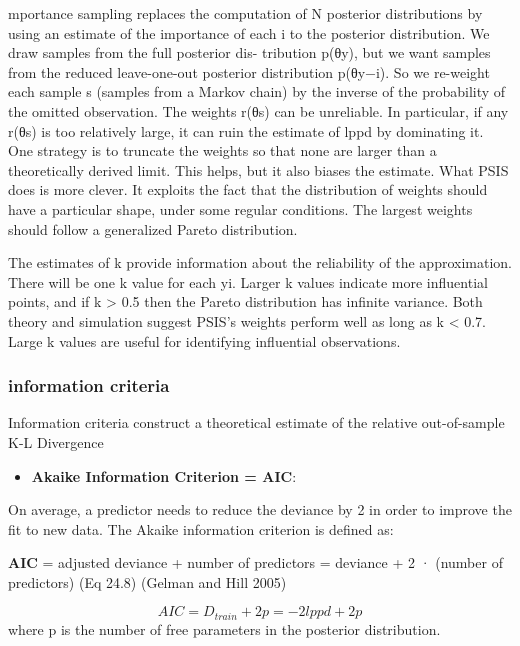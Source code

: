 \documentclass[
]{article}
\providecommand{\tightlist}{%
  \setlength{\itemsep}{0pt}\setlength{\parskip}{0pt}}
\begin{document}
mportance sampling replaces the computation of N posterior distributions
by using an estimate of the importance of each i to the posterior
distribution. We draw samples from the full posterior dis- tribution
p(θ\textbar y), but we want samples from the reduced leave-one-out
posterior distribution p(θ\textbar y−i). So we re-weight each sample s
(samples from a Markov chain) by the inverse of the probability of the
omitted observation. The weights r(θs) can be unreliable. In particular,
if any r(θs) is too relatively large, it can ruin the estimate of lppd
by dominating it. One strategy is to truncate the weights so that none
are larger than a theoretically derived limit. This helps, but it also
biases the estimate. What PSIS does is more clever. It exploits the fact
that the distribution of weights should have a particular shape, under
some regular conditions. The largest weights should follow a generalized
Pareto distribution.

The estimates of k provide information about the reliability of the
approximation. There will be one k value for each yi. Larger k values
indicate more influential points, and if k \textgreater{} 0.5 then the
Pareto distribution has infinite variance. Both theory and simulation
suggest PSIS's weights perform well as long as k \textless{} 0.7. Large
k values are useful for identifying influential observations.

\hypertarget{information-criteria}{%
\subsubsection{information criteria}\label{information-criteria}}

Information criteria construct a theoretical estimate of the relative
out-of-sample K-L Divergence

\begin{itemize}
\tightlist
\item
  \textbf{Akaike Information Criterion = AIC}:
\end{itemize}

On average, a predictor needs to reduce the deviance by 2 in order to
improve the fit to new data. The Akaike information criterion is defined
as:

\textbf{AIC} = adjusted deviance + number of predictors = deviance + 2 ·
(number of predictors) (Eq 24.8) (Gelman and Hill 2005)

\[AIC= D_{train} + 2p = -2lppd + 2p\] where p is the number of free
parameters in the posterior distribution.
\end{document}
